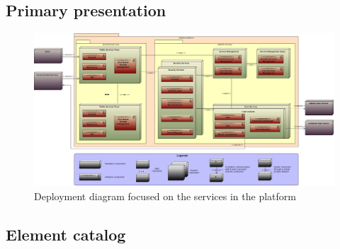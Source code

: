 \documentclass[a4paper,10pt]{article}
\begin{document}
\subsection{Primary presentation}
\begin{center}
    \begin{figure}[!h]
      \includegraphics[width=\textwidth]{../images/deployment_services.jpg}
	\caption{Deployment diagram focused on the services in the platform}
    \end{figure}
  \end{center}

\subsection{Element catalog}
\end{document}
